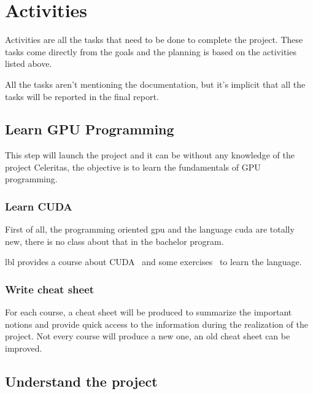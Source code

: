 \chapter{Activities}
\label{spec:ch:activities}

Activities are all the tasks that need to be done to complete the project.
These tasks come directly from the goals and the planning is based on the activities listed above.

All the tasks aren't mentioning the documentation, but it's implicit that all the tasks will be reported in the final report.

\section{Learn GPU Programming}
\label{spec:ch:activities:learn-gpu-programming}

This step will launch the project and it can be without any knowledge of the project Celeritas, the objective is to learn the fundamentals of GPU programming.


\subsection{Learn CUDA}
\label{spec:ch:activities:learn-gpu-programming:learn-cuda}

First of all, the programming oriented \acrshort{gpu} and the language \acrshort{cuda} are totally new, there is no class about that in the bachelor program.

\acrlong{lbl} provides a course about CUDA~\cite{cuda-training} and some exercises~\cite{cuda-series} to learn the language.


\subsection{Write cheat sheet}
\label{spec:spec:ch:activities:learn-gpu-programming:write-cheat-sheet}

For each course, a cheat sheet will be produced to summarize the important notions and provide quick access to the information during the realization of the project.
Not every course will produce a new one, an old cheat sheet can be improved.


\section{Understand the project}
\label{spec:ch:activities:understand-the-project}

